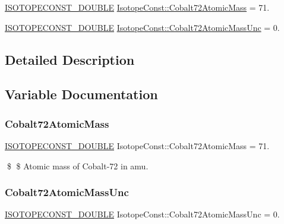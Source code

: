 \begin{DoxyCompactItemize}
\item 
\mbox{\hyperlink{group___isotope_const-_macros_ga8f45a7272ce02c0b4c65c44636ed719a}{I\+S\+O\+T\+O\+P\+E\+C\+O\+N\+S\+T\+\_\+\+D\+O\+U\+B\+LE}} \mbox{\hyperlink{group___isotope_const-_cobalt-_co72_gaa2b5d3259df1a2f73b61bba7f3148617}{Isotope\+Const\+::\+Cobalt72\+Atomic\+Mass}} = 71.
\item 
\mbox{\hyperlink{group___isotope_const-_macros_ga8f45a7272ce02c0b4c65c44636ed719a}{I\+S\+O\+T\+O\+P\+E\+C\+O\+N\+S\+T\+\_\+\+D\+O\+U\+B\+LE}} \mbox{\hyperlink{group___isotope_const-_cobalt-_co72_ga40764bc2302e58b3e0d06c69e902a5d4}{Isotope\+Const\+::\+Cobalt72\+Atomic\+Mass\+Unc}} = 0.
\end{DoxyCompactItemize}


\subsection{Detailed Description}


\subsection{Variable Documentation}
\mbox{\label{group___isotope_const-_cobalt-_co72_gaa2b5d3259df1a2f73b61bba7f3148617}} 
\subsubsection{\texorpdfstring{Cobalt72\+Atomic\+Mass}{Cobalt72AtomicMass}}
{\footnotesize\ttfamily \mbox{\hyperlink{group___isotope_const-_macros_ga8f45a7272ce02c0b4c65c44636ed719a}{I\+S\+O\+T\+O\+P\+E\+C\+O\+N\+S\+T\+\_\+\+D\+O\+U\+B\+LE}} Isotope\+Const\+::\+Cobalt72\+Atomic\+Mass = 71.}

\$ \$ Atomic mass of Cobalt-\/72 in amu. \mbox{\label{group___isotope_const-_cobalt-_co72_ga40764bc2302e58b3e0d06c69e902a5d4}} 
\subsubsection{\texorpdfstring{Cobalt72\+Atomic\+Mass\+Unc}{Cobalt72AtomicMassUnc}}
{\footnotesize\ttfamily \mbox{\hyperlink{group___isotope_const-_macros_ga8f45a7272ce02c0b4c65c44636ed719a}{I\+S\+O\+T\+O\+P\+E\+C\+O\+N\+S\+T\+\_\+\+D\+O\+U\+B\+LE}} Isotope\+Const\+::\+Cobalt72\+Atomic\+Mass\+Unc = 0.}

